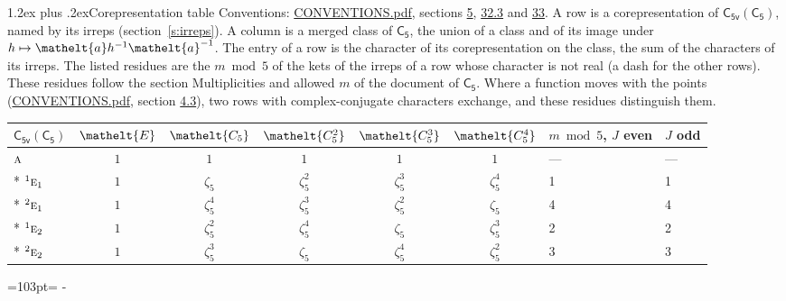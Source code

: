 \documentclass[10pt,a4paper]{article}
\makeatletter
\renewcommand\section{\@startsection{section}{1}{\z@}{-3ex plus -1ex minus -.2ex}%
  {1.2ex plus .2ex}{\normalfont\large\sffamily\bfseries\color{parttitle}}}
\newcommand{\needspace}[1]{\par\penalty-100\begingroup\dimen0=#1\relax\dimen2=\pagegoal
  \advance\dimen2-\pagetotal\ifdim\dimen0>\dimen2\relax\ifdim\dimen2>0pt\vfil\break\fi\fi
  \endgroup}
\numberwithin{equation}{section}
\newcommand{\eltfont}[1]{{\let\sigma\eltsigma\mathelt{#1}}}
\newcommand{\grp}[1]{\mathsf{#1}}
\newcommand{\irr}[1]{\text{\normalfont\scshape #1}}
\newcommand{\conjpair}[1]{{}^{#1}}
\newcommand{\cls}[1]{\eltfont{#1}}
\newcommand{\elt}[1]{\eltfont{#1}}
\newcommand{\rootunity}[1]{\zeta_{#1}}
\makeatother
\begin{document}
\section{Corepresentation table}\label{s:character_table}
Conventions: \href{../../CONVENTIONS.pdf}{CONVENTIONS.pdf}, sections \href{../../../rotation/CONVENTIONS.pdf\#conv.5}{5}, \href{../../CONVENTIONS.pdf\#conv.32.3}{32.3} and \href{../../CONVENTIONS.pdf\#conv.33}{33}.
A row is a corepresentation of $\grp{C_{5v}}(\grp{C_{5}})$, named by its irreps (section~\ref{s:irreps}). A column is a merged class of $\grp{C_{5}}$, the union of a class and of its image under $h \mapsto \elt{a} h^{-1} \elt{a}^{-1}$. The entry of a row is the character of its corepresentation on the class, the sum of the characters of its irreps.
\leavevmode\label{n:head.parity}The listed residues are the $m \bmod 5$ of the kets of the irreps of a row whose character is not real (a dash for the other rows). These residues follow the section Multiplicities and allowed $m$ of the document of \href{../../../rotation/data/pdf/C5.pdf}{$\grp{C_{5}}$}. Where a function moves with the points (\href{../../CONVENTIONS.pdf}{CONVENTIONS.pdf}, section \href{../../../rotation/CONVENTIONS.pdf\#conv.4.3}{4.3}), two rows with complex-conjugate characters exchange, and these residues distinguish them.
{\small\setlength{\tabcolsep}{4pt}\begin{longtable}{@{}lcccccll@{}}\toprule
$\grp{C_{5v}}(\grp{C_{5}})$ & $\cls{E}$ & $\cls{C_{5}}$ & $\cls{C_{5}^{2}}$ & $\cls{C_{5}^{3}}$ & $\cls{C_{5}^{4}}$ & $m \bmod 5$, $J$ even & $J$ odd\\\midrule\endhead
\bottomrule\endfoot\endlastfoot
$\irr{a}$ & $1$ & $1$ & $1$ & $1$ & $1$ & --- & ---\\*
$\conjpair{1}\irr{e}_{1}$ & $1$ & $\rootunity{5}$ & $\rootunity{5}^{2}$ & $\rootunity{5}^{3}$ & $\rootunity{5}^{4}$ & 1 & 1\\*
$\conjpair{2}\irr{e}_{1}$ & $1$ & $\rootunity{5}^{4}$ & $\rootunity{5}^{3}$ & $\rootunity{5}^{2}$ & $\rootunity{5}$ & 4 & 4\\*
$\conjpair{1}\irr{e}_{2}$ & $1$ & $\rootunity{5}^{2}$ & $\rootunity{5}^{4}$ & $\rootunity{5}$ & $\rootunity{5}^{3}$ & 2 & 2\\*
$\conjpair{2}\irr{e}_{2}$ & $1$ & $\rootunity{5}^{3}$ & $\rootunity{5}$ & $\rootunity{5}^{4}$ & $\rootunity{5}^{2}$ & 3 & 3\\
\bottomrule\end{longtable}}
\needspace{103pt}
\end{document}
